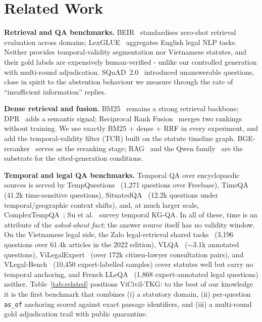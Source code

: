 \documentclass[10pt,a4paper,twocolumn]{article}
\newcommand{\code}[1]{\texttt{#1}}
\begin{document}
\section{Related Work}

\textbf{Retrieval and QA benchmarks.} BEIR~\cite{thakur2021beir} standardises zero-shot retrieval evaluation across domains; LexGLUE~\cite{chalkidis2022lexglue} aggregates English legal NLP tasks. Neither provides temporal-validity segmentation nor Vietnamese statutes, and their gold labels are expensively human-verified - unlike our controlled generation with multi-round adjudication. SQuAD~2.0~\cite{rajpurkar2018squad} introduced unanswerable questions, close in spirit to the abstention behaviour we measure through the rate of ``insufficient information'' replies.

\textbf{Dense retrieval and fusion.} BM25~\cite{robertson2009bm25} remains a strong retrieval backbone; DPR~\cite{karpukhin2020dpr} adds a semantic signal; Reciprocal Rank Fusion~\cite{cormack2009rrf} merges two rankings without training. We use exactly BM25 + dense + RRF in every experiment, and add the temporal-validity filter (TCR) built on the statute timeline graph. BGE-reranker~\cite{xiao2024cpack} serves as the reranking stage; RAG~\cite{lewis2020rag} and the Qwen family~\cite{yang2024qwen25} are the substrate for the cited-generation conditions.

\textbf{Temporal and legal QA benchmarks.} Temporal QA over encyclopaedic sources is served by TempQuestions~\cite{jia2018tempquestions} (1{,}271 questions over Freebase), TimeQA~\cite{chen2021timeqa} (41.2k time-sensitive questions), SituatedQA~\cite{zhang2021situatedqa} (12.2k questions under temporal/geographic context shifts), and, at much larger scale, ComplexTempQA~\cite{gruber2025complextempqa}; Su et al.~\cite{su2024tkgqa} survey temporal KG-QA. In all of these, time is an attribute of the \emph{asked-about fact}; the answer source itself has no validity window. On the Vietnamese legal side, the Zalo legal-retrieval shared tasks~\cite{zalolegal2019} (3{,}196 questions over 61.4k articles in the 2022 edition), VLQA~\cite{vu2025vlqa} ($\sim$3.1k annotated questions), ViLegalExpert~\cite{vilegalexpert2026} (over 172k citizen-lawyer consultation pairs), and VLegal-Bench~\cite{vlegalbench2025} (10{,}450 expert-labelled samples) cover statutes well but carry no temporal anchoring, and French LLeQA~\cite{louis2024lleqa} (1{,}868 expert-annotated legal questions) neither. Table~\ref{tab:related} positions ViCivil-TKG: to the best of our knowledge it is the first benchmark that combines (i) a statutory domain, (ii) per-question \code{as\_of} anchoring scored against exact passage identifiers, and (iii) a multi-round gold adjudication trail with public quarantine.
\end{document}
